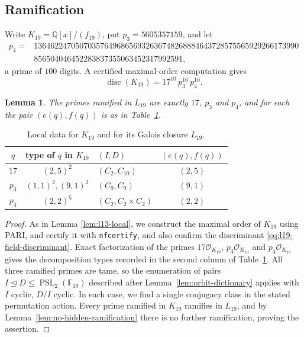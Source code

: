\documentclass[10pt]{amsart}
\numberwithin{equation}{section}
\newcommand{\Disc}{\operatorname{disc}}
\newtheorem{lemma}[theorem]{Lemma}
\theoremstyle{definition}
\theoremstyle{remark}
\newcommand{\F}{\mathbb{F}}
\newcommand{\Q}{\mathbb{Q}}
\newcommand{\PSL}{\operatorname{PSL}}
\begin{document}
\subsection{Ramification}\label{subsec:l19-local}
Write $K_{19}=\Q[x]/(f_{19})$, put $p_3=5605357159$, and let
\begin{equation*}
\begin{split}
 p_4={}&1364622470507035764968656932636748268884643728575565929266173990\\
 &856504046452283837355063452317992591 ,
\end{split}
\end{equation*}
a prime of $100$ digits.  A certified maximal-order computation gives
\begin{equation}\label{eq:l19-field-discriminant}
 \Disc(K_{19})=17^{10}\,p_3^{16}\,p_4^{10} .
\end{equation}

\begin{lemma}\label{lem:l19-local}
The primes ramified in $L_{19}$ are exactly $17$, $p_3$ and $p_4$, and for
each the pair $(e(q),f(q))$ is as in Table~\textup{\ref{tab:l19-local}}.
\end{lemma}
  \begin{table}[ht]
  \centering
  \begin{tabular}{@{}cclc@{}}
  \toprule
  $q$ & type of $q$ in $K_{19}$ & $(I,D)$ & $(e(q),f(q))$\\
  \midrule
  $17$ & $(2,5)^2$ & $(C_2,C_{10})$ & $(2,5)$\\
  $p_3$ & $(1,1)^2,(9,1)^2$ & $(C_9,C_9)$ & $(9,1)$\\
  $p_4$ & $(2,2)^5$ & $(C_2,C_2\times C_2)$ & $(2,2)$\\
  \bottomrule
  \end{tabular}
  \caption{Local data for $K_{19}$ and for its Galois closure $L_{19}$.}
  \label{tab:l19-local}
  \end{table}
 

\begin{proof}


As in Lemma \ref{lem:l13-local}, we construct the maximal order of $K_{19}$ using PARI, and certify it with \texttt{nfcertify}, and also confirm the discriminant \eqref{eq:l19-field-discriminant}. Exact factorization of the primes $17\mathcal O_{K_{19}}$, $p_3\mathcal O_{K_{19}}$ and $p_4\mathcal O_{K_{19}}$ gives the decomposition types recorded in the second column of Table~\ref{tab:l19-local}.
All three ramified primes are tame,
so the enumeration of pairs $I\trianglelefteq D\leq\PSL_2(\F_{19})$
described after Lemma~\ref{lem:orbit-dictionary} applies with $I$ cyclic,
$D/I$ cyclic. In each case, we find a single conjugacy class in the stated permutation action. Every prime ramified in $K_{19}$ ramifies in $L_{19}$, and by
Lemma~\ref{lem:no-hidden-ramification} there is no further ramification, proving the assertion.
\end{proof}
\end{document}
